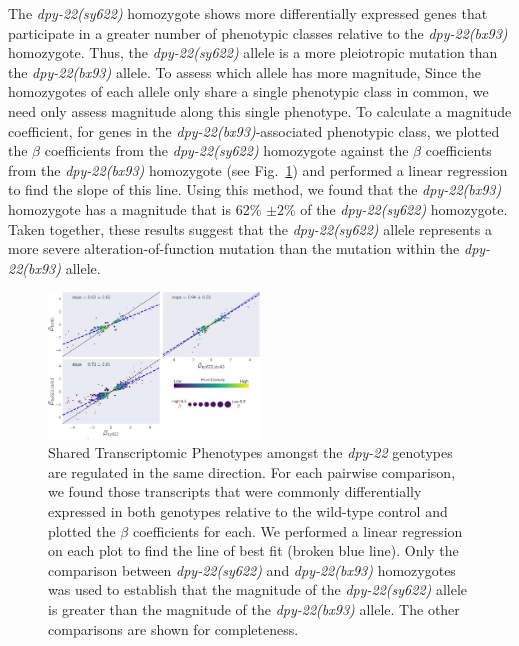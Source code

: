 \documentclass[9pt,twocolumn,twoside]{gsajnl}
\newcommand{\gene}[1]{\mbox{\emph{#1}}}
\newcommand{\dpy}[1]{\gene{dpy-22#1}}
\newcommand{\bx}{\dpy{(bx93)}}
\newcommand{\sy}{\dpy{(sy622)}}
\begin{document}
The \sy{} homozygote shows more differentially expressed genes that participate
in a greater number of phenotypic classes relative to the \bx{} homozygote.
Thus, the \sy{} allele is a more pleiotropic mutation than the \bx{} allele. To
assess which allele has more magnitude,  Since the homozygotes of each allele
only share a single phenotypic class in common, we need only assess magnitude
along this single phenotype. To calculate a magnitude coefficient, for genes in
the \bx{}-associated phenotypic class, we plotted the $\beta$ coefficients from
the \sy{} homozygote against the $\beta$ coefficients from the \bx{} homozygote
(see Fig.~\ref{fig:stp}) and performed a linear regression to find the slope of
this line. Using this method, we found that the \bx{} homozygote has a magnitude
that is 62\% $\pm2\%$ of the \sy{} homozygote. Taken together, these results
suggest that the \sy{} allele represents a more severe alteration-of-function
mutation than the mutation within the \bx{} allele.

\begin{figure}
  \includegraphics[width=0.5\textwidth]{../figs/dpy22-stps.pdf}
  \caption{
           Shared Transcriptomic Phenotypes amongst the \dpy{} genotypes are
           regulated in the same direction. For each pairwise comparison, we
           found those transcripts that were commonly differentially expressed
           in both genotypes relative to the wild-type control and plotted the
           $\beta$ coefficients for each. We performed a linear regression on
           each plot to find the line of best fit (broken blue line). Only the
           comparison between \sy{} and \bx{} homozygotes was used to establish
           that the magnitude of the \sy{} allele is greater than the magnitude
           of the \bx{} allele. The other comparisons are shown for
           completeness.
          }
\label{fig:stp}
\end{figure}
\end{document}
